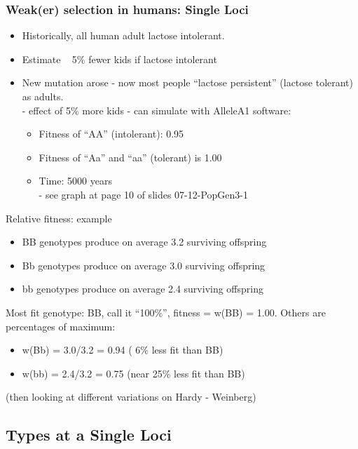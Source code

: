 \documentclass{scrartcl}
\begin{document}
\subsubsection{Weak(er) selection in humans: Single Loci}
\label{sec:07-01-03}
\begin{itemize}
\item Historically, all human adult lactose intolerant.
\item Estimate ~ 5\% fewer kids if lactose intolerant
\item New mutation arose - now most people ``lactose persistent'' (lactose tolerant) as adults.\\
  - effect of 5\% more kids - can simulate with AlleleA1 software:
  \begin{itemize}
  \item Fitness of ``AA'' (intolerant): 0.95
  \item Fitness of ``Aa'' and ``aa'' (tolerant) is 1.00
  \item Time: 5000 years\\
    - see graph at page 10 of slides 07-12-PopGen3-1
  \end{itemize}
\end{itemize}
Relative fitness: example
\begin{itemize}
  \item BB genotypes produce on average 3.2 surviving offspring
  \item Bb genotypes produce on average 3.0 surviving offspring
  \item bb genotypes produce on average 2.4 surviving offspring
\end{itemize}
Most fit genotype: BB, call it ``100\%'', fitness = w(BB) = 1.00. Others are percentages of maximum: \\
\begin{itemize}
  \item w(Bb) = 3.0/3.2 = 0.94 ( 6\% less fit than BB)
  \item w(bb) = 2.4/3.2 = 0.75 (near 25\% less fit than BB)
\end{itemize}
(then looking at different variations on Hardy - Weinberg)

\subsection{Types at a Single Loci}
\label{07-02}
\end{document}
